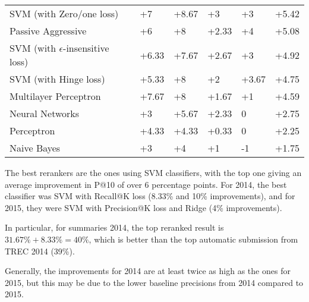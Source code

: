\begin{table}[h!]
{\begin{tabular}{@{}llllll@{}}
SVM (with Zero/one loss)            	& +7                       & +8.67                       & +3                       & +3                          & +5.42             \\
Passive Aggressive              	& +6                       & +8                          & +2.33                    & +4                          & +5.08             \\
SVM (with $\epsilon$-insensitive loss)	& +6.33                    & +7.67                       & +2.67                    & +3                          & +4.92             \\
SVM (with Hinge loss)              	& +5.33                    & +8                          & +2                       & +3.67                       & +4.75             \\
Multilayer Perceptron            	& +7.67                    & +8                          & +1.67                    & +1                          & +4.59             \\
Neural Networks                  	& +3                       & +5.67                       & +2.33                    & 0                           & +2.75             \\
Perceptron                          	& +4.33                    & +4.33                       & +0.33                    & 0                           & +2.25             \\
Naive Bayes                        	& +3                       & +4                          & +1                       & -1                          & +1.75             \\ \bottomrule
\end{tabular}%
}
\end{table}

The best rerankers are the ones using SVM classifiers, with the top one giving an average improvement in P@10 of over 6 percentage
points. For 2014, the best classifier was SVM with Recall@K loss (8.33\% and 10\% improvements),
and for 2015, they were SVM with Precision@K loss and Ridge (4\% improvements).

In particular, for summaries 2014, the top reranked result is $31.67\%+8.33\% = 40\%$, which is better than the top automatic submission
from TREC 2014 (39\%).

Generally, the improvements for 2014 are at least
twice as high as the ones for 2015, but this may be due to the lower baseline precisions from 2014 compared to 2015.

